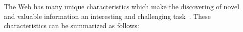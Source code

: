 

The Web has many unique characteristics which make the discovering of novel and valuable information an interesting and challenging task~\cite{Liu:2006}. These characteristics can be summarized as follows: 
